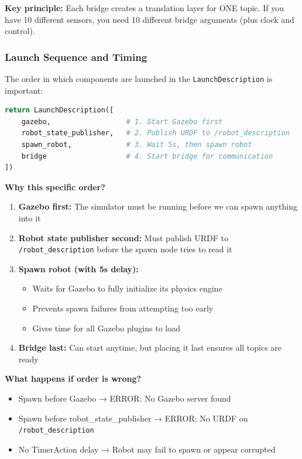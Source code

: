 \vspace{0.3cm}

\textbf{Key principle:} Each bridge creates a translation layer for ONE topic. If you have 10 different sensors, you need 10 different bridge arguments (plus clock and control).

\subsubsection{Launch Sequence and Timing}

The order in which components are launched in the \texttt{LaunchDescription} is important:

\begin{lstlisting}[language=Python]
return LaunchDescription([
    gazebo,                  # 1. Start Gazebo first
    robot_state_publisher,   # 2. Publish URDF to /robot_description
    spawn_robot,             # 3. Wait 5s, then spawn robot
    bridge                   # 4. Start bridge for communication
])
\end{lstlisting}

\textbf{Why this specific order?}

\begin{enumerate}
	\item \textbf{Gazebo first:} The simulator must be running before we can spawn anything into it
	\item \textbf{Robot state publisher second:} Must publish URDF to \texttt{/robot\_description} before the spawn node tries to read it
	\item \textbf{Spawn robot (with 5s delay):} 
	\begin{itemize}
		\item Waits for Gazebo to fully initialize its physics engine
		\item Prevents spawn failures from attempting too early
		\item Gives time for all Gazebo plugins to load
	\end{itemize}
	\item \textbf{Bridge last:} Can start anytime, but placing it last ensures all topics are ready
\end{enumerate}

\textbf{What happens if order is wrong?}
\begin{itemize}
	\item Spawn before Gazebo → ERROR: No Gazebo server found
	\item Spawn before robot\_state\_publisher → ERROR: No URDF on \texttt{/robot\_description}
	\item No TimerAction delay → Robot may fail to spawn or appear corrupted
\end{itemize}

